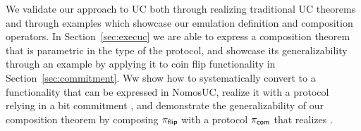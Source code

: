 We validate our approach to UC both through realizing traditional UC theorems and through examples which showcase our emulation definition and composition operators.
In Section~\ref{sec:execuc} we are able to express a composition theorem that is parametric in the type of the protocol, and showcase its generalizability through an example 
by applying it to coin flip functionality \Fflip in Section~\ref{sec:commitment}.
Ww show how to systematically convert \Fflip to a functionality that can be expressed in NomosUC, realize it with a protocol relying in a bit commitment \Fcom, and demonstrate the generalizability of our composition theorem by composing $\pi_{\mathsf{flip}}$ with a protocol $\pi_{\mathsf{com}}$ that realizes \Fcom.  

%




